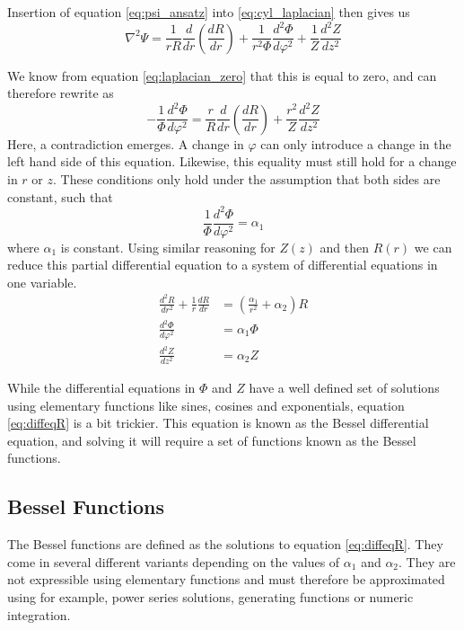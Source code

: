 Insertion of equation \ref{eq:psi_ansatz} into \ref{eq:cyl_laplacian}
then gives us
\begin{equation}
    \nabla^2 \Psi = \frac{1}{rR} \frac{d}{dr} \left(\frac{dR}{dr} \right)
    + \frac{1}{r^2 \varPhi} \frac{d^2 \varPhi}{d\varphi^2}
    + \frac{1}{Z} \frac{d^2 Z}{dz^2}
    \label{eq:sepLaplacian}
\end{equation}

We know from equation \ref{eq:laplacian_zero} that this is equal to zero,
and can therefore rewrite as
\begin{equation}
    -\frac{1}{\varPhi} \frac{d^2 \varPhi}{d\varphi^2} =
    \frac{r}{R} \frac{d}{dr} \left(\frac{dR}{dr} \right)
    + \frac{r^2}{Z} \frac{d^2 Z}{dz^2}
\end{equation}
Here, a contradiction emerges. A change in $\varphi$ can only
introduce a change in the left hand side of this equation. Likewise,
this equality must still hold for a change in $r$ or $z$. These
conditions only hold under the assumption that both sides are constant,
such that
\begin{equation}
    \frac{1}{\varPhi} \frac{d^2 \varPhi}{d\varphi^2} = \alpha_1
\end{equation}
where $\alpha_1$ is constant. Using similar reasoning for $Z(z)$
and then $R(r)$ we can reduce this partial differential equation to
a system of differential equations in one variable.
\begin{align}
    \frac{d^2R}{dr^2} + \frac{1}{r} \frac{dR}{dr} & =
    \left( \frac{\alpha_1}{r^2} + \alpha_2 \right)R
    \label{eq:diffeqR}                                                \\
    \frac{d^2 \varPhi}{d\varphi^2}                & = \alpha_1\varPhi
    \label{eq:diffeqPhi}                                              \\
    \frac{d^2 Z}{dz^2}                            & = \alpha_2 Z
    \label{eq:diffeqZ}
\end{align}

While the differential equations in $\varPhi$ and $Z$ have a well defined
set of solutions using elementary functions like sines, cosines and exponentials,
equation \ref*{eq:diffeqR} is a bit trickier. This equation is known as
the Bessel differential equation, and solving it will require a
set of functions known as the Bessel functions. \cite{weisstein_bessel}

\subsection{Bessel Functions}
The Bessel functions are defined as the solutions to equation \ref*{eq:diffeqR}.
They come in several different variants depending on the values of $\alpha_1$ and
$\alpha_2$. They are not expressible using elementary functions and must therefore
be approximated using for example, power series solutions, generating functions
or numeric integration.

